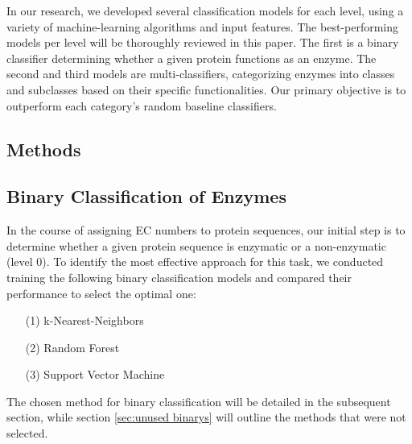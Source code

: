 \documentclass{bioinfo}
\begin{document}
In our research, we developed several classification models for each level, using a variety of machine-learning algorithms and input features.
The best-performing models per level will be thoroughly reviewed in this paper.
The first is a binary classifier determining whether a given protein functions as an enzyme. 
The second and third models are multi-classifiers, categorizing enzymes into classes and subclasses 
based on their specific functionalities. 
Our primary objective is to outperform each category's random baseline classifiers.

\begin{methods}
\section{Methods}

\subsection{Binary Classification of Enzymes}
In the course of assigning EC numbers to protein sequences,
our initial step is to determine whether a given protein sequence is enzymatic or a non-enzymatic (level 0).
To identify the most effective approach for this task,
we conducted training the following binary classification models and compared their performance to select the optimal one:
\begin{enumerate}
	\item[(1)] k-Nearest-Neighbors
	\item[(2)] Random Forest 
	\item[(3)] Support Vector Machine
\end{enumerate}

The chosen method for binary classification will be detailed in the subsequent section, while section \ref{sec:unused binarys} will outline the methods that were not selected.



\end{methods}
\end{document}
